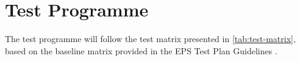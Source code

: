 %
%
%
%
%

%
%
%
%
%

\chapter{Test Programme} \label{ch:test-programme}

The test programme will follow the test matrix presented in \autoref{tab:test-matrix}, based on the baseline matrix provided in the EPS Test Plan Guidelines \cite{eps-guidelines}.



